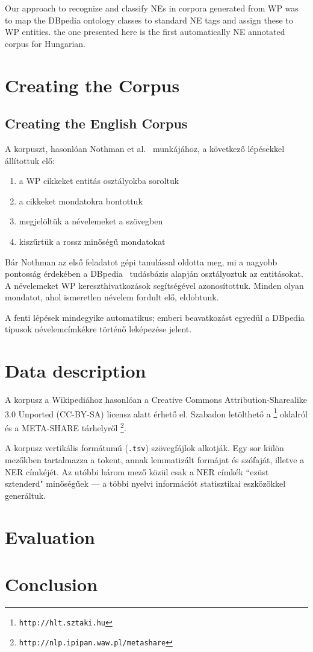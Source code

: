 \documentclass{llncs}
\begin{document}
Our approach to recognize and classify NEs in corpora generated from WP was to
map the DBpedia ontology classes to standard NE tags and assign these to WP
entities. the one presented here is the first automatically NE annotated corpus for Hungarian.

\section{Creating the Corpus}
\subsection{Creating the English Corpus}

A korpuszt, hasonlóan Nothman et al.~ munkájához, a következő
lépésekkel állítottuk elő:
 
\begin{enumerate}
\item a WP cikkeket entitás osztályokba soroltuk
\item a cikkeket mondatokra bontottuk
\item megjelöltük a névelemeket a szövegben
\item kiszűrtük a rossz minőségű mondatokat
\end{enumerate}

Bár Nothman az első feladatot gépi tanulással oldotta meg, mi a nagyobb
pontosság érdekében a DBpedia~\cite{Bizer:09} tudásbázis alapján osztályoztuk az
entitásokat. A névelemeket WP kereszthivatkozások segítségével azonosítottuk. Minden
olyan mondatot, ahol ismeretlen névelem fordult elő, eldobtunk.

A fenti lépések mindegyike automatikus; emberi beavatkozást egyedül a DBpedia típusok
névelemcímkékre történő leképezése jelent.

\section{Data description}

A korpusz a Wikipediához hasonlóan a Creative Commons Attribution-Sharealike
3.0 Unported (CC-BY-SA) licensz alatt érhető el. Szabadon letölthető a
\footnote{\texttt{http://hlt.sztaki.hu}} oldalról és a META-SHARE tárhelyről
\footnote{\texttt{http://nlp.ipipan.waw.pl/metashare}}.

A korpusz vertikális formátumú (\texttt{.tsv}) szövegfájlok alkotják. Egy sor külön
mezőkben tartalmazza a tokent, annak lemmatizált formájat és szófaját, illetve a NER
címkéjét. Az utóbbi három mező közül csak a NER címkék ``ezüst sztenderd" minőségűek
--- a többi nyelvi információt statisztikai eszközökkel generáltuk.

\section{Evaluation}

\section{Conclusion}

\cite{Nothman:08} \cite{Szarvas:06} \cite{Medelyan:09}

%
%


\end{document}
